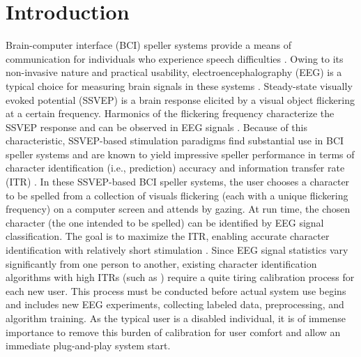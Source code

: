 \documentclass[12pt]{iopart}
\begin{document}
%

%
%
% 
%



\section{Introduction}


\label{sec:IN}
Brain-computer interface (BCI) speller systems provide a means of communication for individuals who experience speech difficulties \cite{journal_bci}. Owing to its non-invasive nature and practical usability, electroencephalography (EEG) is a typical choice for measuring brain signals in these systems \cite{journal_eeg}. Steady-state visually evoked potential (SSVEP) is a brain response elicited by a visual object flickering at a certain frequency. Harmonics of the flickering frequency characterize the SSVEP response and can be observed in EEG signals \cite{ournetwork}. Because of this characteristic, SSVEP-based stimulation paradigms find substantial use in BCI speller systems \cite{ssvep_bci_review} and are known to yield impressive speller performance in terms of character identification (i.e., prediction) accuracy and information transfer rate (ITR) \cite{ssvep_common}. In these SSVEP-based BCI speller systems, the user chooses a character to be spelled from a collection of visuals flickering (each with a unique flickering frequency) on a computer screen and attends by gazing. At run time, the chosen character (the one intended to be spelled) can be identified by EEG signal classification. The goal is to maximize the ITR, enabling accurate character identification with relatively short stimulation \cite{ournetwork}. Since EEG signal statistics vary significantly from one person to another, existing character identification algorithms with high ITRs (such as \cite{ournetwork,convca}) require a quite tiring calibration process for each new user. This process must be conducted before actual system use begins and includes new EEG experiments, collecting labeled data, preprocessing, and algorithm training.  As the typical user is a disabled individual, it is of immense importance to remove this burden of calibration for user comfort and allow an immediate plug-and-play system start. 
\end{document}
